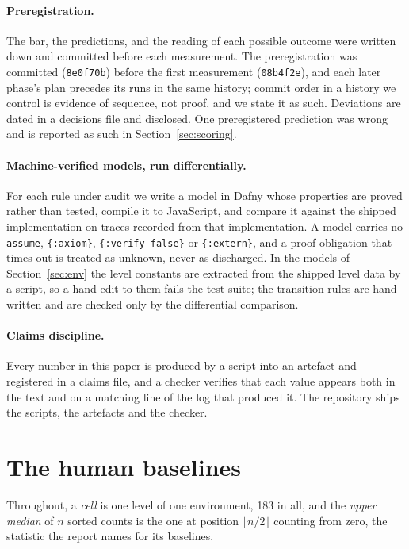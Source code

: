 \documentclass[11pt]{article}
\newcommand{\code}[1]{\texttt{#1}}
\begin{document}
\paragraph{Preregistration.} The bar, the predictions, and the reading of each
possible outcome were written down and committed before each measurement.
The preregistration was committed (\code{8e0f70b}) before the first measurement
(\code{08b4f2e}), and each later phase's plan precedes its runs in the same
history; commit order in a history we control is evidence of sequence, not
proof, and we state it as such. Deviations are dated in a decisions file and disclosed. One preregistered
prediction was wrong and is reported as such in Section~\ref{sec:scoring}.

\paragraph{Machine-verified models, run differentially.} For each rule under
audit we write a model in Dafny \cite{dafny} whose properties are proved rather
than tested, compile it to JavaScript, and compare it against the shipped
implementation on traces recorded from that implementation. A model carries no
\code{assume}, \code{\{:axiom\}}, \code{\{:verify false\}} or \code{\{:extern\}},
and a proof obligation that times out is treated as unknown, never as
discharged. In the models of Section~\ref{sec:env} the level constants are
extracted from the shipped level data by a script, so a hand edit to them
fails the test suite; the transition rules are hand-written and are checked
only by the differential comparison.

\paragraph{Claims discipline.} Every number in this paper is produced by a
script into an artefact and registered in a claims file, and a checker verifies
that each value appears both in the text and on a matching line of the log that
produced it. The repository ships the scripts, the artefacts and the checker.

\section{The human baselines}
\label{sec:baselines}

Throughout, a \emph{cell} is one level of one environment, 183 in all, and the
\emph{upper median} of $n$ sorted counts is the one at position
$\lfloor n/2 \rfloor$ counting from zero, the statistic the report names for its
baselines.
\end{document}
